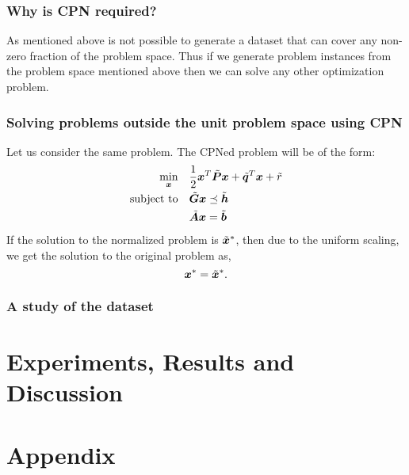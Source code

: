 \documentclass{article} %
\begin{document}
   \subsubsection{Why is CPN required?}
   As mentioned above is not possible to generate a dataset that can cover any non-zero fraction of the problem space. Thus if we generate problem instances from the problem space mentioned above then we can solve any other optimization problem.  
   
   \subsubsection{Solving problems outside the unit problem space using CPN}
   
   Let us consider the same problem. The CPNed problem will be of the form: 
   \begin{subequations}
      \begin{align}
         \min_{{\bm{x}}} \quad &\frac{1}{2}{\bm{x}}^T \tilde{{\bm{P}}} {\bm{x}} + \tilde{{\bm{q}}}^T {\bm{x}} + \tilde{r} \\
         \text{subject to} \quad &\tilde{{\bm{G}}} {\bm{x}} \preceq \tilde{{\bm{h}}} \\
         \quad &\tilde{{\bm{A}}} {\bm{x}} = \tilde{{\bm{b}}}  
      \end{align}
   \end{subequations}
   If the solution to the normalized problem is $\tilde{{\bm{x}}}^*$, then due to the uniform scaling, we get the solution to the original problem as, \[
   {{\bm{x}}}^* = \tilde{{\bm{x}}}^*.
   \]

   \subsubsection{A study of the dataset}
   

\section{Experiments, Results and Discussion}  




\appendix
\section{Appendix}
\end{document}
